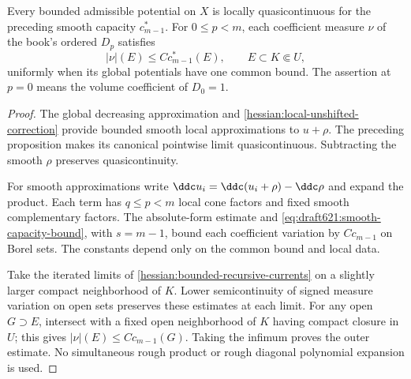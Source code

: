 \begin{lemma}\label{draft621:rough-coefficient-capacity}
Every bounded admissible potential on $X$ is locally quasicontinuous
for the preceding smooth capacity $c_{m-1}^*$. For $0\leq p<m$,
each coefficient measure $\nu$ of the book's ordered $D_p$ satisfies
\[
 |\nu|(E)\leq C c_{m-1}^*(E),\qquad E\subset K\Subset U,
\]
uniformly when its global potentials have one common bound.
The assertion at $p=0$ means the volume coefficient of $D_0=1$.
\end{lemma}
\begin{proof}
The global decreasing approximation and
\cref{hessian:local-unshifted-correction} provide bounded smooth
local approximations to $u+\rho$. The preceding proposition makes
its canonical pointwise limit quasicontinuous. Subtracting the
smooth $\rho$ preserves quasicontinuity.

For smooth approximations write
$\ddc u_i=\ddc(u_i+\rho)-\ddc\rho$ and expand the product.
Each term has $q\leq p<m$ local cone factors and fixed smooth
complementary factors. The absolute-form estimate and
\eqref{eq:draft621:smooth-capacity-bound}, with $s=m-1$, bound
each coefficient variation by $C c_{m-1}$ on Borel sets.
The constants depend only on the common bound and local data.

Take the iterated limits of
\cref{hessian:bounded-recursive-currents} on a slightly larger
compact neighborhood of $K$. Lower semicontinuity of signed
measure variation on open sets preserves these estimates at each
limit. For any open $G\supset E$, intersect with a fixed open
neighborhood of $K$ having compact closure in $U$; this gives
$|\nu|(E)\leq Cc_{m-1}(G)$. Taking the infimum proves the outer
estimate. No simultaneous rough product or rough diagonal
polynomial expansion is used.
\end{proof}

